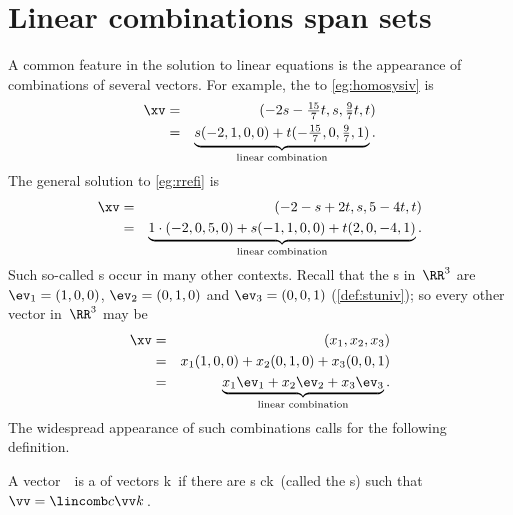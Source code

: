 
\section{Linear combinations span sets}
\label{sec:lcss}
{}

A common feature in the solution to linear equations is the  appearance of combinations of several vectors.
For example, the  to \cref{eg:homosysiv}  is 
\begin{eqnarray*}
\xv&=&(-2s-\tfrac{15}7t,s,\tfrac97t,t) 
\\&=&\underbrace{s(-2,1,0,0)+t(-\tfrac{15}7,0,\tfrac97,1)}_{\text{linear combination}}.
\end{eqnarray*}
The general solution to \cref{eg:rrefi} is
\begin{eqnarray*}
\xv&=&(-2-s+2t,s,5-4t,t)
\\&=&\underbrace{1\cdot(-2,0,5,0)+s(-1,1,0,0)+t(2,0,-4,1)}_{\text{linear combination}}.
\end{eqnarray*}
Such so-called s occur in many other contexts.
Recall that the s in~\(\RR^3\) are \(\ev_1=(1,0,0)\), \(\ev_2=(0,1,0)\) and \(\ev_3=(0,0,1)\) (\cref{def:stuniv}); so every other vector in~\(\RR^3\) may be 
\begin{eqnarray*}
\xv&=&(x_1,x_2,x_3)
\\&=&x_1(1,0,0)+x_2(0,1,0)+x_3(0,0,1)
\\&=&\underbrace{x_1\ev_1+x_2\ev_2+x_3\ev_3}_{\text{linear combination}}.
\end{eqnarray*}
The widespread appearance of such combinations calls for the following definition.

\begin{definition} \label{def:lincom}
A vector~\vv\ is a  of vectors \hlist\vv k\ if there are s \hlist ck\ (called the s) such that \(\vv=\lincomb c\vv k\)\,.
\end{definition}



